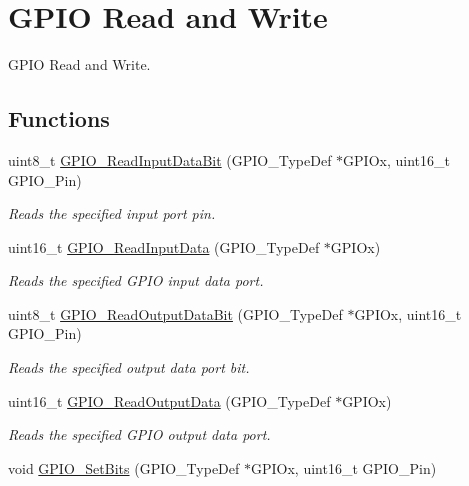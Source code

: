 \hypertarget{group___g_p_i_o___group2}{\section{G\-P\-I\-O Read and Write}
\label{group___g_p_i_o___group2}
}


G\-P\-I\-O Read and Write.  


\subsection*{Functions}
\begin{DoxyCompactItemize}
\item 
uint8\-\_\-t \hyperlink{group___g_p_i_o___group2_ga98772ef6b639b3fa06c8ae5ba28d3aaa}{G\-P\-I\-O\-\_\-\-Read\-Input\-Data\-Bit} (G\-P\-I\-O\-\_\-\-Type\-Def $\ast$G\-P\-I\-Ox, uint16\-\_\-t G\-P\-I\-O\-\_\-\-Pin)
\begin{DoxyCompactList}\small\item\em Reads the specified input port pin. \end{DoxyCompactList}\item 
uint16\-\_\-t \hyperlink{group___g_p_i_o___group2_ga139a33adc8409288e9f193bbebb5a0f7}{G\-P\-I\-O\-\_\-\-Read\-Input\-Data} (G\-P\-I\-O\-\_\-\-Type\-Def $\ast$G\-P\-I\-Ox)
\begin{DoxyCompactList}\small\item\em Reads the specified G\-P\-I\-O input data port. \end{DoxyCompactList}\item 
uint8\-\_\-t \hyperlink{group___g_p_i_o___group2_ga138270f8695b105b7c6ed405792919c1}{G\-P\-I\-O\-\_\-\-Read\-Output\-Data\-Bit} (G\-P\-I\-O\-\_\-\-Type\-Def $\ast$G\-P\-I\-Ox, uint16\-\_\-t G\-P\-I\-O\-\_\-\-Pin)
\begin{DoxyCompactList}\small\item\em Reads the specified output data port bit. \end{DoxyCompactList}\item 
uint16\-\_\-t \hyperlink{group___g_p_i_o___group2_gaf8938a34280b7dc3e39872a7c17bb323}{G\-P\-I\-O\-\_\-\-Read\-Output\-Data} (G\-P\-I\-O\-\_\-\-Type\-Def $\ast$G\-P\-I\-Ox)
\begin{DoxyCompactList}\small\item\em Reads the specified G\-P\-I\-O output data port. \end{DoxyCompactList}\item 
void \hyperlink{group___g_p_i_o___group2_ga9e1352eed7c6620e18af2d86f6b6ff8e}{G\-P\-I\-O\-\_\-\-Set\-Bits} (G\-P\-I\-O\-\_\-\-Type\-Def $\ast$G\-P\-I\-Ox, uint16\-\_\-t G\-P\-I\-O\-\_\-\-Pin)

\end{DoxyCompactItemize}

